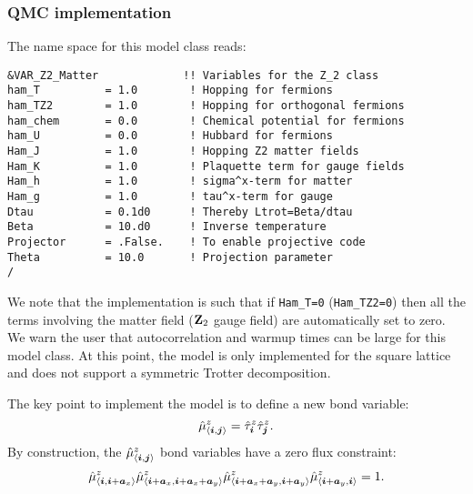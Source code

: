 \subsubsection*{QMC implementation} 

The name space for this model class reads: 

\begin{lstlisting}[style=fortran,escapechar=\#,breaklines=true]
&VAR_Z2_Matter             !! Variables for the Z_2 class
ham_T          = 1.0        ! Hopping for fermions
ham_TZ2        = 1.0        ! Hopping for orthogonal fermions
ham_chem       = 0.0        ! Chemical potential for fermions
ham_U          = 0.0        ! Hubbard for fermions
Ham_J          = 1.0        ! Hopping Z2 matter fields
Ham_K          = 1.0        ! Plaquette term for gauge fields
Ham_h          = 1.0        ! sigma^x-term for matter
Ham_g          = 1.0        ! tau^x-term for gauge
Dtau           = 0.1d0      ! Thereby Ltrot=Beta/dtau
Beta           = 10.d0      ! Inverse temperature
Projector      = .False.    ! To enable projective code
Theta          = 10.0       ! Projection parameter 
/
\end{lstlisting}


We note that the implementation is such that  if \texttt{Ham\_T=0}   (\texttt{Ham\_TZ2=0}) then all the terms involving the matter field ($\mathbf{Z}_{2}$  gauge field) are automatically set to zero.  
We warn the user that autocorrelation and warmup times can be  large for this model class.
At this point,  the model is only implemented for the square lattice  and does not support a symmetric Trotter decomposition.

The key point to implement the model is to  define a new bond variable: 
\begin{equation}
	\hat{\mu}^{z}_{ \langle  \boldsymbol{i}, \boldsymbol{j}  \rangle }  =  \hat{\tau}^{z}_{ \boldsymbol{i}}\hat{\tau}^{z}_{\boldsymbol{j}  }. 
\end{equation}  
By construction, the $\hat{\mu}^{z}_{ \langle  \boldsymbol{i}, \boldsymbol{j}  \rangle } $ bond variables   have a zero flux constraint:
\begin{equation}
	\hat{\mu}^{z}_{ \langle  \boldsymbol{i}, \boldsymbol{i} + \boldsymbol{a}_x  \rangle }  \hat{ \mu}^{z}_{ \langle  \boldsymbol{i} + \boldsymbol{a}_x, \boldsymbol{i} + \boldsymbol{a}_x  + \boldsymbol{a}_y \rangle } 
	\hat{\mu}^{z}_{ \langle  \boldsymbol{i} + \boldsymbol{a}_x + \boldsymbol{a}_y, \boldsymbol{i} +  \boldsymbol{a}_y \rangle } \hat{\mu}^{z}_{ \langle  \boldsymbol{i} + \boldsymbol{a}_y, \boldsymbol{i}  \rangle }  = 1. 
\label{zero_flux.eq}
\end{equation} 


